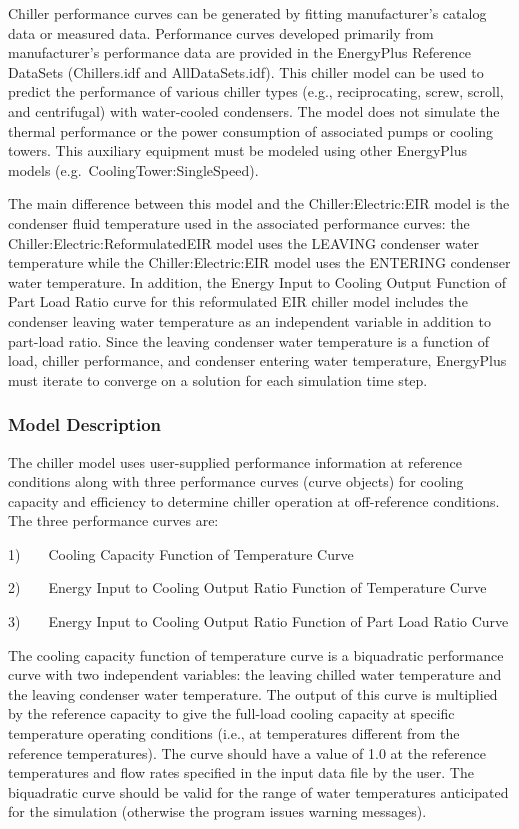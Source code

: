 Chiller performance curves can be generated by fitting manufacturer's catalog data or measured data. Performance curves developed primarily from manufacturer's performance data are provided in the EnergyPlus Reference DataSets (Chillers.idf and AllDataSets.idf). This chiller model can be used to predict the performance of various chiller types (e.g., reciprocating, screw, scroll, and centrifugal) with water-cooled condensers. The model does not simulate the thermal performance or the power consumption of associated pumps or cooling towers. This auxiliary equipment must be modeled using other EnergyPlus models (e.g.~CoolingTower:SingleSpeed).

The main difference between this model and the Chiller:Electric:EIR model is the condenser fluid temperature used in the associated performance curves: the Chiller:Electric:ReformulatedEIR model uses the LEAVING condenser water temperature while the Chiller:Electric:EIR model uses the ENTERING condenser water temperature. In addition, the Energy Input to Cooling Output Function of Part Load Ratio curve for this reformulated EIR chiller model includes the condenser leaving water temperature as an independent variable in addition to part-load ratio. Since the leaving condenser water temperature is a function of load, chiller performance, and condenser entering water temperature, EnergyPlus must iterate to converge on a solution for each simulation time step.

\subsubsection{Model Description}\label{model-description-3-002}

The chiller model uses user-supplied performance information at reference conditions along with three performance curves (curve objects) for cooling capacity and efficiency to determine chiller operation at off-reference conditions. The three performance curves are:

1)~~~~Cooling Capacity Function of Temperature Curve

2)~~~~Energy Input to Cooling Output Ratio Function of Temperature Curve

3)~~~~Energy Input to Cooling Output Ratio Function of Part Load Ratio Curve

The cooling capacity function of temperature curve is a biquadratic performance curve with two independent variables: the leaving chilled water temperature and the leaving condenser water temperature. The output of this curve is multiplied by the reference capacity to give the full-load cooling capacity at specific temperature operating conditions (i.e., at temperatures different from the reference temperatures). The curve should have a value of 1.0 at the reference temperatures and flow rates specified in the input data file by the user. The biquadratic curve should be valid for the range of water temperatures anticipated for the simulation (otherwise the program issues warning messages).

